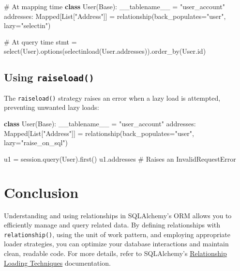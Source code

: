 \documentclass[
  letterpaper,
  DIV=11,
  numbers=noendperiod]{scrreprt}
\newenvironment{Shaded}{\begin{snugshade}}{\end{snugshade}}
\newcommand{\BuiltInTok}[1]{\textcolor[rgb]{0.00,0.23,0.31}{#1}}
\newcommand{\CommentTok}[1]{\textcolor[rgb]{0.37,0.37,0.37}{#1}}
\newcommand{\KeywordTok}[1]{\textcolor[rgb]{0.00,0.23,0.31}{\textbf{#1}}}
\newcommand{\NormalTok}[1]{\textcolor[rgb]{0.00,0.23,0.31}{#1}}
\newcommand{\OperatorTok}[1]{\textcolor[rgb]{0.37,0.37,0.37}{#1}}
\newcommand{\StringTok}[1]{\textcolor[rgb]{0.13,0.47,0.30}{#1}}
\begin{document}
\begin{Shaded}
\begin{Highlighting}[]
\CommentTok{\# At mapping time}
\KeywordTok{class}\NormalTok{ User(Base):}
\NormalTok{    \_\_tablename\_\_ }\OperatorTok{=} \StringTok{"user\_account"}
\NormalTok{    addresses: Mapped[List[}\StringTok{"Address"}\NormalTok{]] }\OperatorTok{=}\NormalTok{ relationship(back\_populates}\OperatorTok{=}\StringTok{"user"}\NormalTok{, lazy}\OperatorTok{=}\StringTok{"selectin"}\NormalTok{)}

\CommentTok{\# At query time}
\NormalTok{stmt }\OperatorTok{=}\NormalTok{ select(User).options(selectinload(User.addresses)).order\_by(User.}\BuiltInTok{id}\NormalTok{)}
\end{Highlighting}
\end{Shaded}

\subsection{\texorpdfstring{Using
\texttt{raiseload()}}{Using raiseload()}}\label{using-raiseload}

The \texttt{raiseload()} strategy raises an error when a lazy load is
attempted, preventing unwanted lazy loads:

\begin{Shaded}
\begin{Highlighting}[]
\KeywordTok{class}\NormalTok{ User(Base):}
\NormalTok{    \_\_tablename\_\_ }\OperatorTok{=} \StringTok{"user\_account"}
\NormalTok{    addresses: Mapped[List[}\StringTok{"Address"}\NormalTok{]] }\OperatorTok{=}\NormalTok{ relationship(back\_populates}\OperatorTok{=}\StringTok{"user"}\NormalTok{, lazy}\OperatorTok{=}\StringTok{"raise\_on\_sql"}\NormalTok{)}

\NormalTok{u1 }\OperatorTok{=}\NormalTok{ session.query(User).first()}
\NormalTok{u1.addresses  }\CommentTok{\# Raises an InvalidRequestError}
\end{Highlighting}
\end{Shaded}

\section{Conclusion}\label{conclusion-23}

Understanding and using relationships in SQLAlchemy's ORM allows you to
efficiently manage and query related data. By defining relationships
with \texttt{relationship()}, using the unit of work pattern, and
employing appropriate loader strategies, you can optimize your database
interactions and maintain clean, readable code. For more details, refer
to SQLAlchemy's
\href{https://docs.sqlalchemy.org/en/14/orm/loading_relationships.html}{Relationship
Loading Techniques} documentation.
\end{document}

